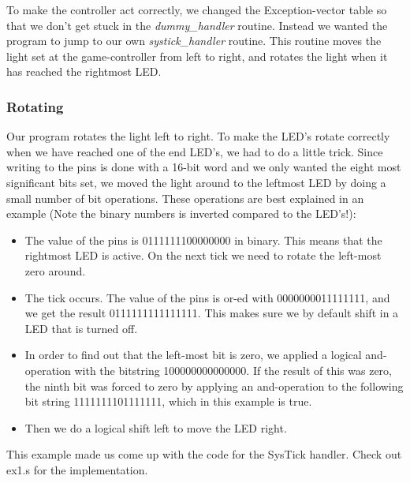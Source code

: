 To make the controller act correctly, we changed the Exception-vector table so that we don't get stuck in the \emph{dummy\_handler} routine. Instead we wanted the program to jump to our own \emph{systick\_handler} routine. This routine moves the light set at the game-controller from left to right, and rotates the light when it has reached the rightmost LED.

	\subsubsection{Rotating}
	Our program rotates the light left to right. To make the LED's rotate correctly when we have reached one of the end LED's, we had to do a little trick. Since writing to the pins is done with a 16-bit word and we only wanted the eight most significant bits set, we moved the light around to the leftmost LED by doing a small number of bit operations. These operations are best explained in an example (Note the binary numbers is inverted compared to the LED's!):
	\begin{itemize}
	\item The value of the pins is 0111111100000000 in binary. This means that the rightmost LED is active. On the next tick we need to rotate the left-most zero around.
	\item The tick occurs. The value of the pins is or-ed with 0000000011111111, and we get the result 0111111111111111. This makes sure we by default shift in a LED that is turned off.
	\item  In order to find out that the left-most bit is zero, we applied a logical and-operation with the bitstring 100000000000000. If the result of this was zero, the ninth bit was forced to zero by applying an and-operation to the following bit string 1111111101111111, which in this example is true.
	\item Then we do a logical shift left to move the LED right.
	\end{itemize}

This example made us come up with the code for the SysTick handler. Check out ex1.s for the implementation.
